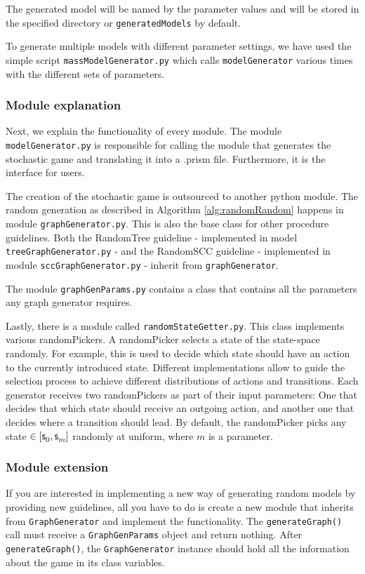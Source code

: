 The generated model will be named by the parameter values and will be stored in the specified directory or \texttt{generatedModels} by default.

To generate multiple models with different parameter settings, we have used the simple script \texttt{massModelGenerator.py} which calls \texttt{modelGenerator} various times with the different sets of parameters.

\subsubsection*{Module explanation}
Next, we explain the functionality of every module. The module \texttt{modelGenerator.py} is responsible for calling the module that generates the stochastic game and translating it into a .prism file. 
Furthermore, it is the interface for users.

The creation of the stochastic game is outsourced to another python module. The random generation as described in Algorithm \ref{alg:randomRandom} happens in
module \texttt{graphGenerator.py}. This is also the base class for other procedure guidelines. 
Both the RandomTree guideline - implemented in model \texttt{treeGraphGenerator.py} - and the RandomSCC guideline - implemented in module \texttt{sccGraphGenerator.py} - inherit
from \texttt{graphGenerator}.

The module \texttt{graphGenParams.py} contains a class that contains all the parameters any graph generator requires. 

Lastly, there is a module called \texttt{randomStateGetter.py}. This class implements various randomPickers.
A randomPicker selects a state of the state-space randomly.
For example, this is used to decide which state should have an action to the currently introduced state.
Different implementations allow to guide the selection process to achieve different distributions of actions and transitions.
Each generator receives two randomPickers as part of their input parameters: One that decides that which state should receive an outgoing action, 
and another one that decides where a transition should lead. By default, the randomPicker picks any state $\in [\initstate, \state<m>]$ randomly at uniform, where $m$ is a parameter.

\subsubsection*{Module extension}
If you are interested in implementing a new way of generating random models by providing new guidelines, all you have to do is create a new
module that inherits from \texttt{GraphGenerator} and implement the functionality. The \texttt{generateGraph()} call must receive a \texttt{GraphGenParams} object and return nothing.
After \texttt{generateGraph()}, the \texttt{GraphGenerator} instance should hold all the information about the game in its class variables.
\FloatBarrier